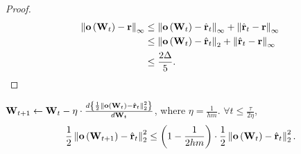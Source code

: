 \begin{proof}
\begin{equation*}
\begin{split}
    \left\| {\mathbf{o}}\left( {\mathbf{W}}_t \right) - {\mathbf{r}} \right\|_\infty &\le \left\| {\mathbf{o}}\left( {\mathbf{W}}_t \right) - \hat{{\mathbf{r}}}_t\right\|_\infty + \left\| \hat{{\mathbf{r}}}_t - {\mathbf{r}}\right\|_\infty \\
    &\le \left\| {\mathbf{o}}\left( {\mathbf{W}}_t \right) - \hat{{\mathbf{r}}}_t\right\|_2 + \left\| \hat{{\mathbf{r}}}_t - {\mathbf{r}}\right\|_\infty \\
    &\le \frac{2 \Delta}{5}. \qedhere
\end{split}
\end{equation*}
\end{proof}

\begin{lem}
\label{lem:logit_l2_loss_parameter_smoothness}
${\mathbf{W}}_{t+1} \leftarrow {\mathbf{W}}_t - \eta \cdot \frac{d \left\{ \frac{1}{2} \left\| {\mathbf{o}}\left( {\mathbf{W}}_t\right) - \hat{{\mathbf{r}}}_t \right\|_2^2 \right\}}{d {\mathbf{W}}_t}$, where $\eta = \frac{1}{h m}$. $\forall t \le \frac{\tau}{2 \eta}$,
\begin{equation*}
\begin{split}
    \frac{1}{2} \left\| {\mathbf{o}}\left( {\mathbf{W}}_{t+1} \right) - \hat{{\mathbf{r}}}_t \right\|_2^2 \le \left( 1 - \frac{1}{2 h m} \right) \cdot \frac{1}{2} \left\| {\mathbf{o}}\left( {\mathbf{W}}_t \right) - \hat{{\mathbf{r}}}_t \right\|_2^2.
\end{split}
\end{equation*}
\end{lem}
